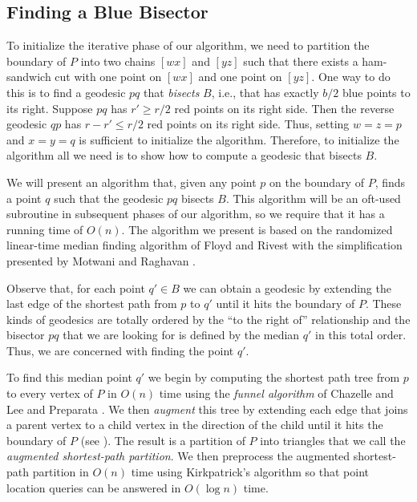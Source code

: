 \documentclass[charterfonts,lotsofwhite]{patmorin}
\newcommand{\chain}[2]{[#1#2]}
\begin{document}
\subsection{Finding a Blue Bisector}

To initialize the iterative phase of our algorithm, we need to
partition the boundary of $P$ into two chains $\chain{w}{x}$ and
$\chain{y}{z}$ such that there exists a ham-sandwich cut with one point
on $\chain{w}{x}$ and one point on $\chain{y}{z}$.  One way to do this is
to find a geodesic $pq$ that \emph{bisects} $B$, i.e., that has
exactly $b/2$ blue points to its right.  Suppose $pq$ has $r'\ge r/2$
red points on its right side. Then the reverse geodesic $qp$ has
$r-r'\le r/2$ red points on its right side.  Thus, setting $w=z=p$ and
$x=y=q$ is sufficient to initialize the algorithm.   Therefore, to
initialize the algorithm all we need is to show how to compute a
geodesic that bisects $B$.

We will present an algorithm that, given any point $p$ on the boundary
of $P$, finds a point $q$ such that the geodesic $pq$ bisects $B$.
This algorithm will be an oft-used subroutine in subsequent phases of
our algorithm, so we require that it has a running time of $O(n)$.
The algorithm we present is based on the randomized linear-time median
finding algorithm of Floyd and Rivest \cite{fr75} with the
simplification presented by Motwani and Raghavan
\cite[Section~3.3]{mr95}.  

Observe that, for each point $q'\in B$ we can obtain a geodesic by
extending the last edge of the shortest path from $p$ to $q'$ until it
hits the boundary of $P$.  These kinds of geodesics are totally
ordered by the ``to the right of'' relationship and the bisector $pq$
that we are looking for is defined by the median $q'$ in this total
order.  Thus, we are concerned with finding the point $q'$. 

To find this median point $q'$ we begin by computing the shortest path
tree from $p$ to every vertex of $P$ in $O(n)$ time using the
\emph{funnel algorithm} of Chazelle \cite{c82} and Lee and Preparata
\cite{lp84}.  We then \emph{augment} this tree by extending each edge
that joins a parent vertex to a child vertex in the direction of the
child until it hits the boundary of $P$ (see
). The result is a partition of $P$ into
triangles that we call the \emph{augmented shortest-path partition}.
We then preprocess the augmented shortest-path partition in $O(n)$
time using Kirkpatrick's algorithm \cite{k83} so that point location
queries can be answered in $O(\log n)$ time.
\end{document}
